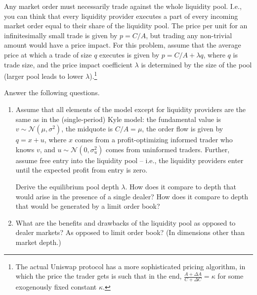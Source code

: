 	Any market order must necessarily trade against the whole liquidity pool. I.e., you can think that every liquidity provider executes a part of every incoming market order equal to their share of the liquidity pool. The price per unit for an infinitesimally small trade is given by $p=C/A$, but trading any non-trivial amount would have a price impact. For this problem, assume that the average price at which a trade of size $q$ executes is given by $p = C/A + \lambda q$, where $q$ is trade size, and the price impact coefficient $\lambda$ is determined by the size of the pool (larger pool leads to lower $\lambda$).\footnote{The actual Uniswap protocol has a more sophisticated pricing algorithm, in which the price the trader gets is such that in the end, $\frac{A+\varDelta A}{C+\varDelta C} = \kappa$ for some exogenously fixed constant $\kappa$.}
	
	Answer the following questions.
	\begin{enumerate}
		\item Assume that all elements of the model except for liquidity providers are the same as in the (single-period) Kyle model: the fundamental value is $v \sim \mathcal{N}(\mu,\sigma^2)$, the midquote is $C/A=\mu$, the order flow is given by $q=x+u$, where $x$ comes from a profit-optimizing informed trader who knows $v$, and $u \sim \mathcal{N}(0,\sigma^2_u)$ comes from uninformed traders. Further, assume free entry into the liquidity pool -- i.e., the liquidity providers enter until the expected profit from entry is zero. 
		
		Derive the equilibrium pool depth $\lambda$. How does it compare to depth that would arise in the presence of a single dealer? How does it compare to depth that would be generated by a limit order book?
		
		\item What are the benefits and drawbacks of the liquidity pool as opposed to dealer markets? As opposed to limit order book? (In dimensions other than market depth.)
	\end{enumerate}



